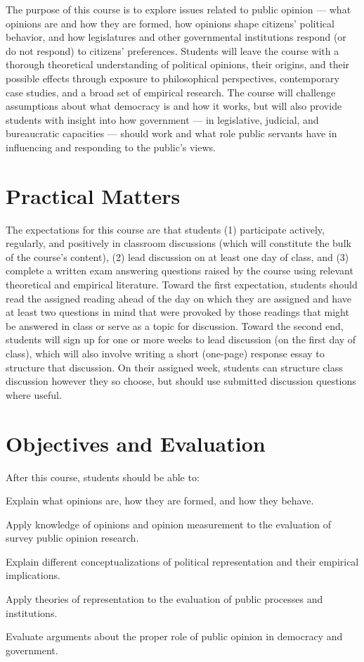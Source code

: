 \documentclass[12pt,a4paper]{article}
\begin{document}
The purpose of this course is to explore issues related to public opinion --- what opinions are and how they are formed, how opinions shape citizens' political behavior, and how legislatures and other governmental institutions respond (or do not respond) to citizens' preferences. Students will leave the course with a thorough theoretical understanding of political opinions, their origins, and their possible effects through exposure to philosophical perspectives, contemporary case studies, and a broad set of empirical research. The course will challenge assumptions about what democracy is and how it works, but will also provide students with insight into how government --- in legislative, judicial, and bureaucratic capacities --- should work and what role public servants have in influencing and responding to the public's views.

\section{Practical Matters}

The expectations for this course are that students (1) participate actively, regularly, and positively in classroom discussions (which will constitute the bulk of the course's content), (2) lead discussion on at least one day of class, and (3) complete a written exam answering questions raised by the course using relevant theoretical and empirical literature. Toward the first expectation, students should read the assigned reading ahead of the day on which they are assigned and have at least two questions in mind that were provoked by those readings that might be answered in class or serve as a topic for discussion. Toward the second end, students will sign up for one or more weeks to lead discussion (on the first day of class), which will also involve writing a short (one-page) response essay to structure that discussion. On their assigned week, students can structure class discussion however they so choose, but should use submitted discussion questions where useful.

\section{Objectives and Evaluation}
After this course, students should be able to:
\begin{enumerate*}
\item Explain what opinions are, how they are formed, and how they behave.
\item Apply knowledge of opinions and opinion measurement to the evaluation of survey public opinion research.
\item Explain different conceptualizations of political representation and their empirical implications.
\item Apply theories of representation to the evaluation of public processes and institutions.
\item Evaluate arguments about the proper role of public opinion in democracy and government.
\end{enumerate*}
\end{document}
